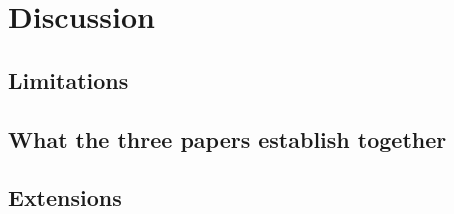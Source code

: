 
\section{Discussion}
\label{p3:sec:discussion}

\subsection{Limitations}
\label{p3:sub:limitations}

\subsection{What the three papers establish together}
\label{p3:sub:what_the_program_establishes}

\subsection{Extensions}
\label{p3:sub:extensions}
